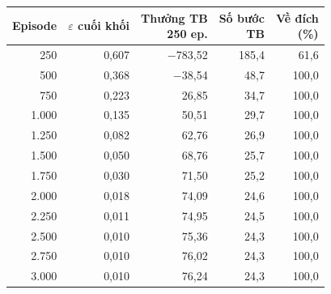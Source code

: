 \begin{tabular}{rrrrr}
\toprule
Episode & $\varepsilon$ cuối khối & \makecell[r]{Thưởng TB\\250 ep.} & \makecell[r]{Số bước\\TB} & \makecell[r]{Về đích\\(\%)} \\
\midrule
250 & 0,607 & −783,52 & 185,4 & 61,6 \\
500 & 0,368 & −38,54 & 48,7 & 100,0 \\
750 & 0,223 & 26,85 & 34,7 & 100,0 \\
1.000 & 0,135 & 50,51 & 29,7 & 100,0 \\
1.250 & 0,082 & 62,76 & 26,9 & 100,0 \\
1.500 & 0,050 & 68,76 & 25,7 & 100,0 \\
1.750 & 0,030 & 71,50 & 25,2 & 100,0 \\
2.000 & 0,018 & 74,09 & 24,6 & 100,0 \\
2.250 & 0,011 & 74,95 & 24,5 & 100,0 \\
2.500 & 0,010 & 75,36 & 24,3 & 100,0 \\
2.750 & 0,010 & 76,02 & 24,3 & 100,0 \\
3.000 & 0,010 & 76,24 & 24,3 & 100,0 \\
\bottomrule
\end{tabular}
